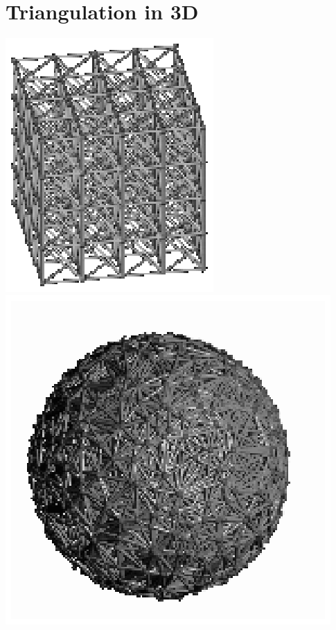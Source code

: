 \chapter{Triangulation in 3D}
\label{chapter-Triangulation3}
\begin{ccTexOnly}
\vspace*{-2cm}
\includegraphics{grille.eps} \hspace*{2cm} \includegraphics{sphere.eps} 
\end{ccTexOnly}
